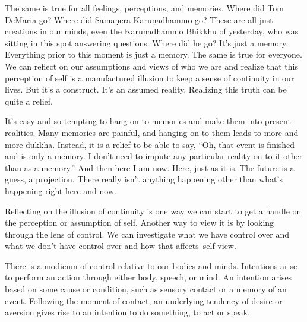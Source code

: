 \enlargethispage{1\baselineskip}
The same is true for all feelings, perceptions, and memories. Where did Tom DeMaria go? Where did Sāmaṇera Karuṇadhammo go? These are all just creations in our minds, even the Karuṇadhammo Bhikkhu of yesterday, who was sitting in this spot answering questions. Where did he go? It's just a memory. Everything prior to this moment is just a memory. The same is true for everyone. We can reflect on our assumptions and views of who we are and realize that this perception of self is a manufactured illusion to keep a sense of continuity in our lives. But it's a construct. It's an assumed reality. Realizing this truth can be quite a relief.{\parfillskip=0pt \par}

It's easy and so tempting to hang on to memories and make them into present realities. Many memories are painful, and hanging on to them leads to more and more dukkha. Instead, it is a relief to be able to say, ``Oh, that event is finished and is only a memory. I don't need to impute any particular reality on to it other than as a memory.'' And then here I am now. Here, just as it is. The future is a guess, a projection. There really isn't anything happening other than what's happening right here and now.

Reflecting on the illusion of continuity is one way we can start to get a handle on the perception or assumption of self. Another way to view it is by looking through the lens of control. We can investigate what we have control over and what we don't have control over and how that \mbox{affects self-view.}

There is a modicum of control relative to our bodies and minds. Intentions arise to perform an action through either body, speech, or mind. An intention arises based on some cause or condition, such as sensory contact or a memory of an event. Following the moment of contact, an underlying tendency of desire or aversion gives rise to an intention to do something, to act or speak.

